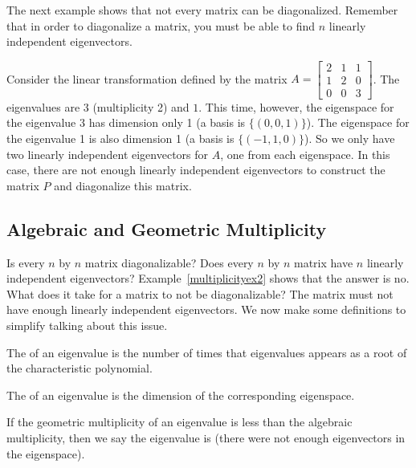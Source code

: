 The next example shows that not every matrix can be diagonalized.  Remember that in order to diagonalize a matrix, you must be able to find $n$ linearly independent eigenvectors. 

\begin{example} \label{multiplicityex2}
Consider the linear transformation defined by the matrix
$A=  
\begin{bmatrix}
 2 & 1 & 1 \\
 1 & 2 & 0 \\
 0 & 0 & 3
\end{bmatrix} 
$. 
The eigenvalues are $3$ (multiplicity 2) and $1$. This time, however, the eigenspace for the eigenvalue 3 has dimension only 1 (a basis is $\{(0,0,1)\}$).  The eigenspace for the eigenvalue 1 is also dimension 1 (a basis is $\{(-1,1,0)\}$).  So we only have two linearly independent eigenvectors for $A$, one from each eigenspace.  In this case, there are not enough linearly independent eigenvectors to construct the matrix $P$ and diagonalize this matrix.  
\end{example}

\subsection{Algebraic and Geometric Multiplicity}
Is every $n$ by $n$ matrix diagonalizable?  
Does every $n$ by $n$ matrix have $n$ linearly independent eigenvectors? 
Example~\ref{multiplicityex2} shows that the answer is no. 
What does it take for a matrix to not be diagonalizable? 
The matrix must not have enough linearly independent eigenvectors.
We now make some definitions to simplify talking about this issue.
\begin{definition}
The  of an eigenvalue is the number of times that eigenvalues appears as a root of the characteristic polynomial.

The  of an eigenvalue is the dimension of the corresponding eigenspace.

If the geometric multiplicity of an eigenvalue is less than the algebraic multiplicity, then we say the eigenvalue is  (there were not enough eigenvectors in the eigenspace).
\end{definition}


